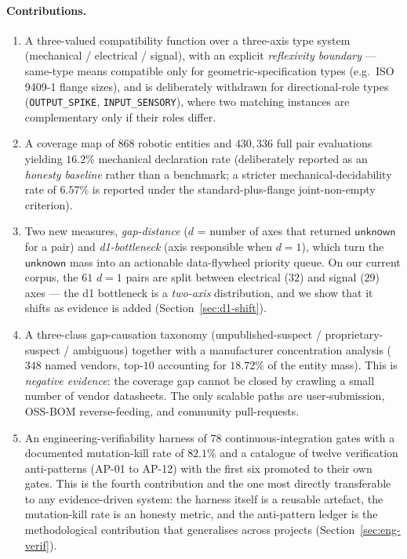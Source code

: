 \documentclass[11pt,twocolumn]{article}
\begin{document}
\paragraph{Contributions.}
\begin{enumerate}[nosep]
\item A three-valued compatibility function over a three-axis type
system (mechanical / electrical / signal), with an explicit
\emph{reflexivity boundary} — same-type means compatible only for
geometric-specification types (e.g.\ ISO 9409-1 flange sizes), and is
deliberately withdrawn for directional-role types
(\texttt{OUTPUT\_SPIKE}, \texttt{INPUT\_SENSORY}), where two matching
instances are complementary only if their roles differ.

\item A coverage map of $868$ robotic entities and $430{,}336$ full
pair evaluations yielding $16.2\%$ mechanical declaration rate
(deliberately reported as an \emph{honesty baseline} rather than
a benchmark; a stricter mechanical-decidability rate of $6.57\%$ is
reported under the standard-plus-flange joint-non-empty criterion).

\item Two new measures, \emph{gap-distance} ($d$ = number of axes
that returned $\mathsf{unknown}$ for a pair) and \emph{d1-bottleneck}
(axis responsible when $d=1$), which turn the $\mathsf{unknown}$ mass
into an actionable data-flywheel priority queue. On our current
corpus, the $61$ $d=1$ pairs are split between electrical ($32$)
and signal ($29$) axes --- the d1 bottleneck is a
\emph{two-axis} distribution, and we show that it shifts as evidence
is added (Section~\ref{sec:d1-shift}).

\item A three-class gap-causation taxonomy
(unpublished-suspect / proprietary-suspect / ambiguous) together with
a manufacturer concentration analysis ($348$ named vendors,
top-$10$ accounting for $18.72\%$ of the entity mass). This is
\emph{negative evidence}: the coverage gap cannot be closed by
crawling a small number of vendor datasheets. The only scalable paths
are user-submission, OSS-BOM reverse-feeding, and community pull-requests.

\item An engineering-verifiability harness of $78$ continuous-integration
gates with a documented mutation-kill rate of $82.1\%$ and a catalogue
of twelve verification anti-patterns (AP-01 to AP-12) with the first
six promoted to their own gates. This is the fourth contribution and
the one most directly transferable to any evidence-driven system: the
harness itself is a reusable artefact, the mutation-kill rate is an
honesty metric, and the anti-pattern ledger is the methodological
contribution that generalises across projects (Section~\ref{sec:eng-verif}).
\end{enumerate}
\end{document}
